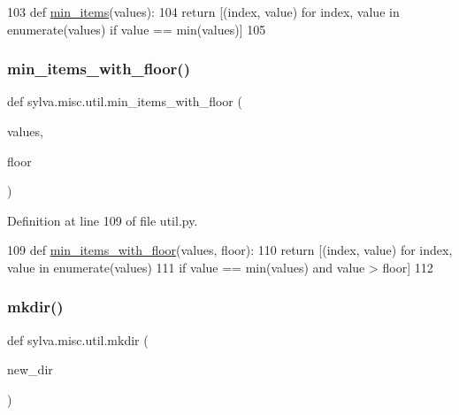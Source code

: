 \begin{DoxyCode}
103 \textcolor{keyword}{def }\hyperlink{namespacesylva_1_1misc_1_1util_a7fdf694403cc19390b498aa430354a22}{min\_items}(values):
104     \textcolor{keywordflow}{return} [(index, value) \textcolor{keywordflow}{for} index, value \textcolor{keywordflow}{in} enumerate(values) \textcolor{keywordflow}{if} value == min(values)]
105 
\end{DoxyCode}
\mbox{\label{namespacesylva_1_1misc_1_1util_a54b027582331f484228cb0a1acac2d90}} 
\subsubsection{\texorpdfstring{min\+\_\+items\+\_\+with\+\_\+floor()}{min\_items\_with\_floor()}}
{\footnotesize\ttfamily def sylva.\+misc.\+util.\+min\+\_\+items\+\_\+with\+\_\+floor (\begin{DoxyParamCaption}\item[{}]{values,  }\item[{}]{floor }\end{DoxyParamCaption})}



Definition at line 109 of file util.\+py.


\begin{DoxyCode}
109 \textcolor{keyword}{def }\hyperlink{namespacesylva_1_1misc_1_1util_a54b027582331f484228cb0a1acac2d90}{min\_items\_with\_floor}(values, floor):
110     \textcolor{keywordflow}{return} [(index, value) \textcolor{keywordflow}{for} index, value \textcolor{keywordflow}{in} enumerate(values)
111             \textcolor{keywordflow}{if} value == min(values) \textcolor{keywordflow}{and} value > floor]
112 
\end{DoxyCode}
\mbox{\label{namespacesylva_1_1misc_1_1util_af426e429c40209bbb46e3a0e8f139a44}} 
\subsubsection{\texorpdfstring{mkdir()}{mkdir()}}
{\footnotesize\ttfamily def sylva.\+misc.\+util.\+mkdir (\begin{DoxyParamCaption}\item[{}]{new\+\_\+dir }\end{DoxyParamCaption})}



